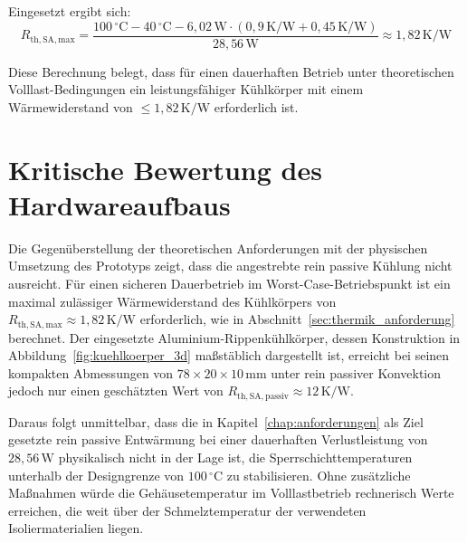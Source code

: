 Eingesetzt ergibt sich:
\begin{equation}
    R_{\mathrm{th,SA,max}} = \frac{100\,^{\circ}\mathrm{C} - 40\,^{\circ}\mathrm{C} - 6{,}02\,\mathrm{W} \cdot (0{,}9\,\mathrm{K/W} + 0{,}45\,\mathrm{K/W})}{28{,}56\,\mathrm{W}} \approx 1{,}82\,\mathrm{K/W}
\end{equation}

Diese Berechnung belegt, dass für einen dauerhaften Betrieb unter theoretischen Volllast-Bedingungen ein leistungsfähiger Kühlkörper mit einem Wärmewiderstand von $\leq 1{,}82\,\mathrm{K/W}$ erforderlich ist.

\section{Kritische Bewertung des Hardwareaufbaus}
\label{sec:thermik_bewertung}

Die Gegenüberstellung der theoretischen Anforderungen mit der physischen Umsetzung des Prototyps zeigt, dass die angestrebte rein passive Kühlung nicht ausreicht. Für einen sicheren Dauerbetrieb im Worst-Case-Betriebspunkt ist ein maximal zulässiger Wärmewiderstand des Kühlkörpers von $R_{\mathrm{th,SA,max}} \approx 1{,}82\,\mathrm{K/W}$ erforderlich, wie in Abschnitt~\ref{sec:thermik_anforderung} berechnet. Der eingesetzte Aluminium-Rippenkühlkörper, dessen Konstruktion in Abbildung~\ref{fig:kuehlkoerper_3d} maßstäblich dargestellt ist, erreicht bei seinen kompakten Abmessungen von $78 \times 20 \times 10\,\mathrm{mm}$ unter rein passiver Konvektion jedoch nur einen geschätzten Wert von $R_{\mathrm{th,SA,passiv}} \approx 12\,\mathrm{K/W}$.

Daraus folgt unmittelbar, dass die in Kapitel~\ref{chap:anforderungen} als Ziel gesetzte rein passive Entwärmung bei einer dauerhaften Verlustleistung von $28{,}56\,\mathrm{W}$ physikalisch nicht in der Lage ist, die Sperrschichttemperaturen unterhalb der Designgrenze von $100\,^{\circ}\mathrm{C}$ zu stabilisieren. Ohne zusätzliche Maßnahmen würde die Gehäusetemperatur im Volllastbetrieb rechnerisch Werte erreichen, die weit über der Schmelztemperatur der verwendeten Isoliermaterialien liegen.

